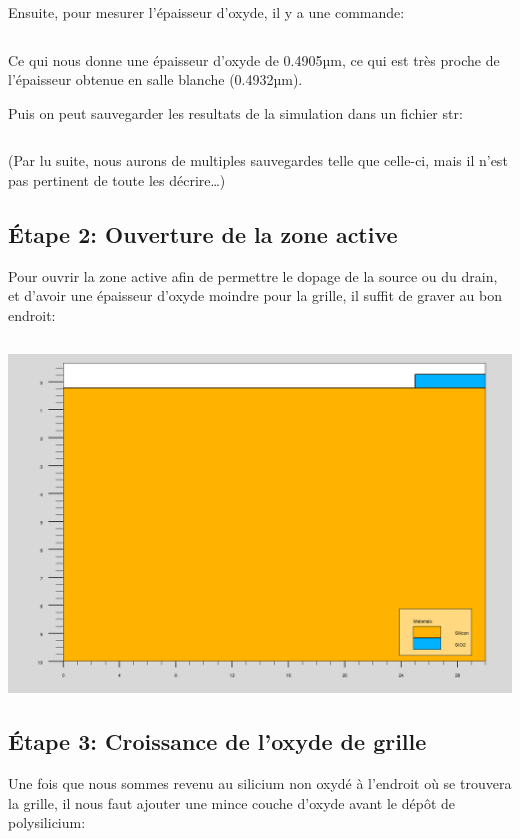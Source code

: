 \documentclass{article}
\begin{document}
\inputminted[linenos,firstnumber=20,firstline=20,lastline=30]{sh}{final_named.in}

Ensuite, pour mesurer l’épaisseur d’oxyde, il y a une commande:
\inputminted[linenos,firstnumber=31,firstline=31,lastline=32]{sh}{final_named.in}

Ce qui nous donne une épaisseur d’oxyde de 0.4905µm, ce qui est très proche de l’épaisseur obtenue en salle blanche (0.4932µm).

Puis on peut sauvegarder les resultats de la simulation dans un fichier str:
\inputminted[linenos,firstnumber=33,firstline=33,lastline=33]{sh}{final_named.in}

(Par lu suite, nous aurons de multiples sauvegardes telle que celle-ci, mais il n’est pas pertinent de toute les décrire…)

\subsection{Étape 2: Ouverture de la zone active}
Pour ouvrir la zone active afin de permettre le dopage de la source ou du drain, et d’avoir une épaisseur d’oxyde moindre pour la grille, il suffit de graver au bon endroit:
\inputminted[linenos,firstnumber=34,firstline=34,lastline=36]{sh}{final_named.in}

\includegraphics[width=\linewidth]{1ouverture.png}


\subsection{Étape 3: Croissance de l’oxyde de grille}
Une fois que nous sommes revenu au silicium non oxydé à l’endroit où se trouvera la grille, il nous faut ajouter une mince couche d’oxyde avant le dépôt de polysilicium:
\inputminted[linenos,firstnumber=37,firstline=37,lastline=42]{sh}{final_named.in}
\end{document}

